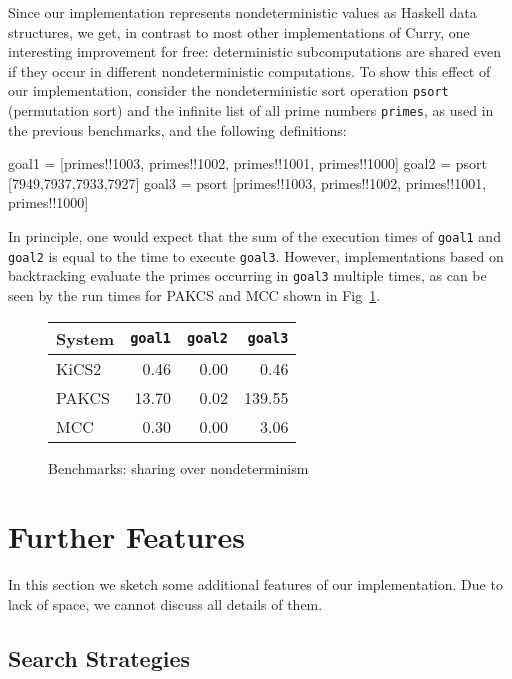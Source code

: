 \documentclass{llncs}
\newcommand{\code}[1]{\mbox{\small\texttt{#1}}}
\begin{document}
Since our implementation represents nondeterministic values
as Haskell data structures, we get, in contrast to most
other implementations of Curry, one interesting improvement for free:
deterministic subcomputations are shared even if they occur
in different nondeterministic computations.
To show this effect of our implementation, consider the
nondeterministic sort operation \code{psort} (permutation sort)
and the infinite list of all prime numbers \code{primes},
as used in the previous benchmarks, and the following definitions:
\begin{curry}
goal1 = [primes!!1003, primes!!1002, primes!!1001, primes!!1000]
goal2 = psort [7949,7937,7933,7927]
goal3 = psort [primes!!1003, primes!!1002, primes!!1001, primes!!1000]
\end{curry}
In principle, one would expect that the sum of the execution times
of \code{goal1} and \code{goal2} is equal to the time to execute
\code{goal3}. However, implementations based on backtracking
evaluate the primes occurring in \code{goal3} multiple times,
as can be seen by the run times for PAKCS and MCC shown
in Fig~\ref{fig:bench-sharing-over-nondet}.
%
\begin{figure}
\centering
\begin{tabular}{|@{~~}l@{~~}|*{3}{@{~~}r@{~~}|}}
\hline
System  & \code{goal1} & \code{goal2} & \code{goal3} \\\hline
KiCS2   &        0.46  &        0.00  &        0.46  \\
PAKCS   &       13.70  &        0.02  &      139.55  \\
MCC     &        0.30  &        0.00  &        3.06  \\
\hline
\end{tabular}
\caption{Benchmarks: sharing over nondeterminism}
 \label{fig:bench-sharing-over-nondet}
\end{figure}


\section{Further Features}
\label{sec:FurtherAspects}

In this section we sketch some additional features of our implementation.
Due to lack of space, we cannot discuss all details of them.

\subsection{Search Strategies}
\end{document}
